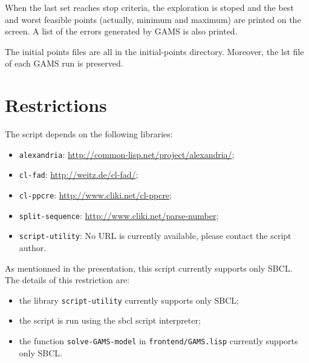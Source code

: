 When the last set reaches stop criteria, the exploration is stoped and the best
and worst feasible points (actually, minimum and maximum) are printed on the
screen. A list of the errors generated by GAMS is also printed.

The initial points files are all in the initial-points directory. Moreover, the
lst file of each GAMS run is preserved.

\section*{Restrictions}

The script depends on the following libraries:
\begin{itemize}
\item \texttt{alexandria}: \url{http://common-lisp.net/project/alexandria/};
\item \texttt{cl-fad}: \url{http://weitz.de/cl-fad/};
\item \texttt{cl-ppcre}: \url{http://www.cliki.net/cl-ppcre};
\item \texttt{split-sequence}: \url{http://www.cliki.net/parse-number};
\item \texttt{script-utility}: No URL is currently available, please contact the
  script author.
\end{itemize}

As mentionned in the presentation, this script currently supports only SBCL.
The details of this restriction are:
\begin{itemize}
\item the library \texttt{script-utility} currently supports only SBCL;
\item the script is run using the sbcl script interpreter;
\item the function \texttt{solve-GAMS-model} in \texttt{frontend/GAMS.lisp}
  currently supports only SBCL.
\end{itemize}
